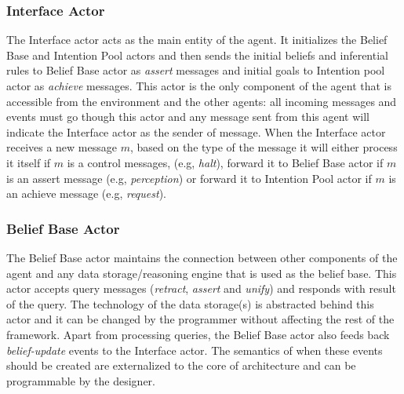 \subsubsection{Interface Actor}
The Interface actor acts as the main entity of the agent. It initializes the Belief Base and Intention Pool actors and then sends the initial beliefs and inferential rules to Belief Base actor as \textit{assert} messages and initial goals to Intention pool actor as \textit{achieve} messages. This actor is the only component of the agent that is accessible from the environment and the other agents: all incoming messages and events must go though this actor and any message sent from this agent will indicate the Interface actor as the sender of message. When the Interface actor receives a new message $m$, based on the type of the message it will either process it itself if $m$ is a control messages, (e.g, \textit{halt}), forward it to Belief Base actor if $m$ is an assert message (e.g, \textit{perception}) or forward it to Intention Pool actor if $m$ is an achieve message (e.g, \textit{request}).

\subsubsection{Belief Base Actor}
The Belief Base actor maintains the connection between other components of the agent and any data storage/reasoning engine that is used as the belief base. This actor accepts query messages (\textit{retract}, 
\textit{assert} and \textit{unify}) and responds with result of the query. The technology of the data storage(s) is abstracted behind this actor and it can be changed by the programmer without affecting the rest of the framework.%
Apart from processing queries, the Belief Base actor also feeds back \textit{belief-update} events to the Interface actor. The semantics of when these events should be created are externalized to the core of architecture and can be programmable by the designer.

